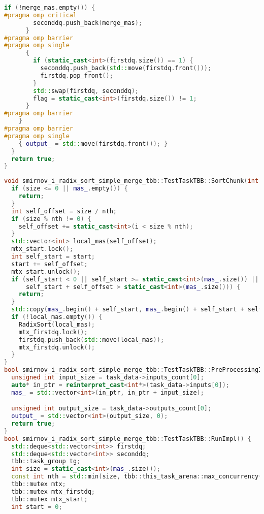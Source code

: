 \documentclass[a4paper,12pt]{article}
\begin{document}
\begin{lstlisting}[language=C++,caption={Фрагмент OpenMP-версии}]
      if (!merge_mas.empty()) {
#pragma omp critical
        seconddq.push_back(merge_mas);
      }
#pragma omp barrier
#pragma omp single
      {
        if (static_cast<int>(firstdq.size()) == 1) {
          seconddq.push_back(std::move(firstdq.front()));
          firstdq.pop_front();
        }
        std::swap(firstdq, seconddq);
        flag = static_cast<int>(firstdq.size()) != 1;
      }
#pragma omp barrier
    }
#pragma omp barrier
#pragma omp single
    { output_ = std::move(firstdq.front()); }
  }
  return true;
}
\end{lstlisting}

\begin{lstlisting}[language=C++,caption={Фрагмент TBB-версии}]
void smirnov_i_radix_sort_simple_merge_tbb::TestTaskTBB::SortChunk(int i, int size, int nth, int& start, tbb::mutex& mtx_start, tbb::mutex& mtx_firstdq,   std::deque<std::vector<int>>& firstdq) {
  if (size <= 0 || mas_.empty()) {
    return;
  }
  int self_offset = size / nth;
  if (size % nth != 0) {
    self_offset += static_cast<int>(i < size % nth);
  }
  std::vector<int> local_mas(self_offset);
  mtx_start.lock();
  int self_start = start;
  start += self_offset;
  mtx_start.unlock();
  if (self_start < 0 || self_start >= static_cast<int>(mas_.size()) || self_offset < 0 ||
      self_start + self_offset > static_cast<int>(mas_.size())) {
    return;
  }
  std::copy(mas_.begin() + self_start, mas_.begin() + self_start + self_offset, local_mas.begin());
  if (!local_mas.empty()) {
    RadixSort(local_mas);
    mtx_firstdq.lock();
    firstdq.push_back(std::move(local_mas));
    mtx_firstdq.unlock();
  }
}
bool smirnov_i_radix_sort_simple_merge_tbb::TestTaskTBB::PreProcessingImpl() {
  unsigned int input_size = task_data->inputs_count[0];
  auto* in_ptr = reinterpret_cast<int*>(task_data->inputs[0]);
  mas_ = std::vector<int>(in_ptr, in_ptr + input_size);

  unsigned int output_size = task_data->outputs_count[0];
  output_ = std::vector<int>(output_size, 0);
  return true;
}
bool smirnov_i_radix_sort_simple_merge_tbb::TestTaskTBB::RunImpl() {
  std::deque<std::vector<int>> firstdq;
  std::deque<std::vector<int>> seconddq;
  tbb::task_group tg;
  int size = static_cast<int>(mas_.size());
  const int nth = std::min(size, tbb::this_task_arena::max_concurrency());
  tbb::mutex mtx;
  tbb::mutex mtx_firstdq;
  tbb::mutex mtx_start;
  int start = 0;


\end{lstlisting}
\end{document}
